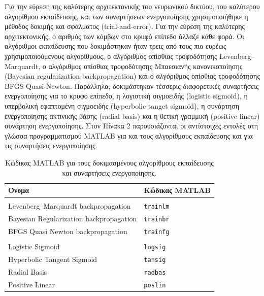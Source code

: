 \documentclass[12pt, a4paper]{report} %
\newcommand{\english}{\foreignlanguage{english}}
\begin{document}
Για την εύρεση της καλύτερης αρχιτεκτονικής του νευρωνικού δικτύου, του καλύτερου αλγορίθμου εκπαίδευσης, και των 
συναρτήσεων ενεργοποίησης χρησιμοποιήθηκε η μέθοδος δοκιμής και σφάλματος (\english{trial-and-error}). Για την εύρεση 
της καλύτερης αρχιτεκτονικής, ο αριθμός των κόμβων στο κρυφό επίπεδο άλλαζε κάθε φορά. Οι αλγόριθμοι εκπαίδευσης που 
δοκιμάστηκαν ήταν τρεις από τους πιο ευρέως χρησιμοποιούμενους αλγορίθμους, ο αλγόριθμος οπίσθιας τροφοδότησης 
\english{Levenberg–Marquardt}, ο αλγόριθμος οπίσθιας τροφοδότησης Μπαεσιανής κανονικοποίησης 
(\english{Bayesian regularization backpropagation}) και ο αλγόριθμος οπίσθιας τροφοδότησης \english{BFGS Quasi-Newton}. 
Παράλληλα, δοκιμάστηκαν τέσσερις διαφορετικές συναρτήσεις ενεργοποί\-ησης για το κρυφό επίπεδο, η λογιστική σιγμοειδής 
(\english{logistic sigmoid}), η υπερβολική εφαπτομένη σιγμοειδής (\english{hyperbolic tanget sigmoid}), η συνάρτηση 
ενεργοποίησης ακτινικής βάσης (\english{radial basis}) και η θετική γραμμική (\english{positive linear}) συνάρτηση 
ενεργοποίησης. Στον Πίνακα 2 παρουσιάζονται οι αντίστοιχες εντολές στη γλώσσα προγραμματισμού \english{MATLAB} για και 
τους αλγορίθμους εκπαίδευσης και για τις συναρτήσεις ενεργοποίησης.

\begin{table}[ht]
    \centering
    \caption{Κώδικας \english{MATLAB} για τους δοκιμασμένους αλγορίθμους εκπαίδευσης και συναρτήσεις ενεργοποίησης.}\label{tab_tr_alg_act_fnc} 
        \begin{tabular}{>{\centering\arraybackslash}m{7.5cm} >{\centering\arraybackslash}m{7.5cm}}
        \toprule
        \textbf{Όνομα} & \textbf{Κώδικας \english{MATLAB}} \\
        \midrule
        \multicolumn{2}{c}{\textbf{Αλγόριθμοι Εκπαίδευσης}} \\
        \midrule
        \english{Levenberg–Marquardt backpropagation} & \texttt{\english{trainlm}} \\
        \english{Bayesian Regularization backpropagation} & \texttt{\english{trainbr}} \\ 
        \english{BFGS Quasi Newton backpropagation} & \texttt{\english{trainfg}} \\
        \midrule
        \multicolumn{2}{c}{\textbf{Συναρτήσεις Ενεργοποίησης}} \\
        \midrule
        \english{Logistic Sigmoid} & \texttt{\english{logsig}} \\
        \english{Hyperbolic Tangent Sigmoid} & \texttt{\english{tansig}} \\ 
        \english{Radial Basis} & \texttt{\english{radbas}} \\ 
        \english{Positive Linear} & \texttt{\english{poslin}} \\ 
        \bottomrule
    \end{tabular}
\end{table}
\end{document}
